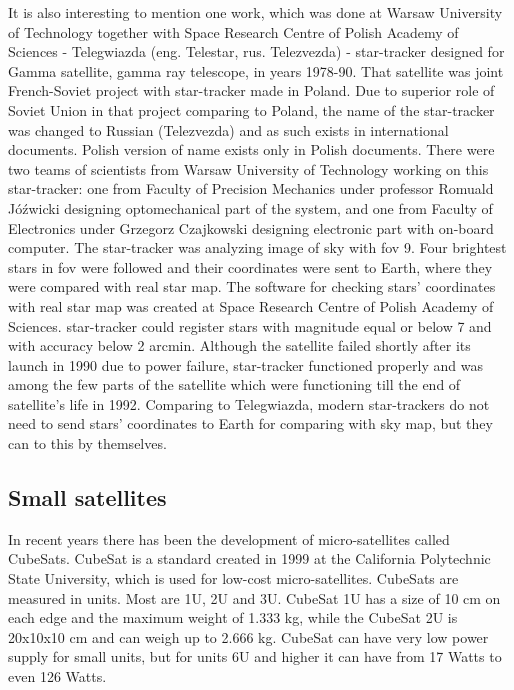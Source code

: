 \documentclass[12pt,a4paper,twoside]{article}
\begin{document}
It is also interesting to mention one work, which was done at Warsaw University of Technology together with Space Research Centre of Polish Academy of Sciences - Telegwiazda (eng. Telestar, rus. Telezvezda) - star-tracker designed for Gamma satellite, gamma ray telescope, in years 1978-90\cite{gamma-satellite}. That satellite was joint French-Soviet project with star-tracker made in Poland. Due to superior role of Soviet Union in that project comparing to Poland, the name of the star-tracker was changed to Russian (Telezvezda) and as such exists in international documents. Polish version of name exists only in Polish documents. There were two teams of scientists from Warsaw University of Technology working on this star-tracker: one from Faculty of Precision Mechanics under professor Romuald Jóźwicki designing optomechanical part of the system, and one from Faculty of Electronics under Grzegorz Czajkowski designing electronic part with on-board computer\cite{wut-space-research}.
The star-tracker was analyzing image of sky with \gls{fov} 9\degree . Four brightest stars in \gls{fov} were followed and their coordinates were sent to Earth, where they were compared with real star map. The software for checking stars' coordinates with real star map was created at Space Research Centre of Polish Academy of Sciences. star-tracker could register stars with magnitude equal or below 7 and with accuracy below 2 arcmin\cite{optical-devices-cbk}. Although the satellite failed shortly after its launch in 1990 due to power failure, star-tracker functioned properly and was among the few parts of the satellite which were functioning till the end of satellite's life in 1992. Comparing to Telegwiazda, modern star-trackers do not need to send stars' coordinates to Earth for comparing with sky map, but they can to this by themselves.


\subsection{Small satellites}

In recent years there has been the development of micro-satellites called CubeSats. CubeSat is a standard created in 1999 at the California Polytechnic State University\cite{heidt2000cubesat}, which is used for low-cost micro-satellites. CubeSats are measured in units. Most are 1U, 2U and 3U. CubeSat 1U has a size of 10 cm on each edge and the maximum weight of 1.333 kg, while the CubeSat 2U is 20x10x10 cm and can weigh up to 2.666 kg. CubeSat can have very low power supply for small units, but for units 6U and higher it can have from 17 Watts\cite{cubesat-panels} to even 126 Watts\cite{nanosat-tables}.
\end{document}
